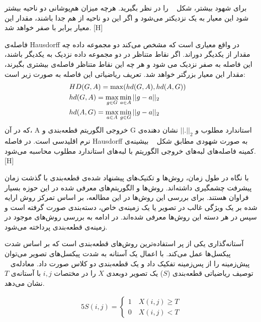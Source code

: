 برای شهود بیشتر، شکل ~ را در نظر بگیرید. هرچه میزان هم‌پوشانی دو ناحیه بیشتر شود این معیار به یک نزدیکتر می‌شود و اگر این دو ناحیه از هم جدا باشند، مقدار این معیار برابر با صفر خواهد شد.
[H]

فاصله‌ی Hausdorff در واقع معیاری است که مشخص می‌کند دو مجموعه داده چه‌ مقدار از یکدیگر دوراند. اگر نقاط متناظر در دو مجموعه داده نزدیک به یکدیگر باشند، این فاصله به صفر نزدیک می شود و هر چه این نقاط متناظر فاصله‌ی بیشتری بگیرند، مقدار این معیار بزرگتر خواهد شد. تعریف ریاضیاتی این فاصله به صورت زیر است:
\begin{alignat}{5}
	&HD(G, A) = \max (hd(G, A), hd(A, G))     \label{hd_def} && \\
	&hd(G, A) = \max_{g \in G} \min_{a \in A} ||g-a||_{2} && \notag \\
	&hd(A, G) = \max_{a \in A} \min_{g \in G} ||g-a||_{2} && \notag
\end{alignat}
که در آن، A خروجی الگوریتم قطعه‌بندی و G استاندارد مطلوب و $||.||_{2}$ نشان دهنده‌ی نرم اقلیدسی است. در فاصله Hausdorff به صورت شهودی مطابق شکل ~ بیشینه‌ی کمینه‌ فاصله‌های لبه‌های خروجی الگوریتم با لبه‌های استاندارد مطلوب محاسبه می‌شود.
[H]

با نگاه در طول زمان، روش‌ها و تکنیک‌های پیشنهاد شده‌ی قطعه‌بندی با گذشت زمان پیشرفت چشمگیری داشته‌اند. روش‌ها و الگوریتم‌های معرفی شده در این حوزه بسیار فراوان هستند. برای بررسی این روش‌ها در این  مطالعه، بر اساس تمرکز روش‌ ارایه شده بر یک ویژگی غالب در تصویر یا یک زمینه‌ی خاص، دسته‌بندی صورت گرفته است و سپس در هر دسته این روش‌ها معرفی شده‌اند. در ادامه به بررسی روش‌های موجود در زمینه‌ی قطعه‌بندی پرداخته می‌شود.

آستانه‌گذاری یکی از پر استفاده‌ترین روش‌های قطعه‌بندی است که بر اساس شدت پیکسل‌ها عمل می‌کند. با اعمال یک آستانه به شدت‌ پیکسل‌های تصویر می‌توان پیش‌زمینه را از پس‌زمینه تفکیک داد و یک قطعه‌بندی دو کلاس صورت داد. معادله‌ی ~ توصیف ریاضیاتی قطعه‌بندی ($S$) یک تصویر دوبعدی $X$ را در مختصات $i, j$ با آستانه‌ی $T$ نشان می‌دهد.

\begin{alignat}{5}
	S(i, j)=
	\left\{
	\begin{array}{l}
		1 \quad X(i, j) \geq T      \\
		0 \quad X(i, j) < T  \label{thresh}
	\end{array}
	\right. %
\end{alignat}

